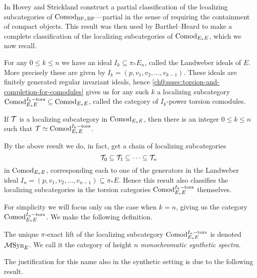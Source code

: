 In \cite{hovey-strickland_2005a} Hovey and Strickland construct a partial classification of the lcoalizing subcategories of $\mathrm{Comod}_{\mathrm{BP}_*\mathrm{BP}}$---partial in the sense of requiring the containment of compact objects. This result was then used by Barthel--Heard to make a complete classification of the localizing subcategories of $\mathrm{Comod}_{E_*E}$, which we now recall. 

For any $0\leq k\leq n$ we have an ideal $I_k \subseteq \pi_* E_n$, called the Landweber ideals of $E$. More precisely these are given by $I_k = (p, v_1, v_2, \ldots, v_{k-1})$. These ideals are finitely generated regular invariant ideals, hence \cref{ch0:sssec:torsion-and-completion-for-comodules} gives us for any such $k$ a localizing subcategory $\mathrm{Comod}_{E_*E}^{I_k-\mathrm{tors}}\subseteq \mathrm{Comod}_{E_*E}$, called the category of $I_k$-power torsion comodules. 

\begin{theorem}
    \label{ch3:add:thm:classification-of-abelian-localizing}
    If $\mathcal{T}$ is a localizing subcategory in $\mathrm{Comod}_{E_*E}$, then there is an integer $0\leq k\leq n$ such that $\mathcal{T} \simeq \mathrm{Comod}_{E_*E}^{I_k-\mathrm{tors}}$. 
\end{theorem}

\begin{remark}
    \label{ch3:add:rm:chain-of-localizing-subcategories}
    By the above result we do, in fact, get a chain of localizing subcategories
    \[\mathcal{T}_0 \subseteq \mathcal{T}_1\subseteq \cdots \subseteq \mathcal{T}_n \]
    in $\mathrm{Comod}_{E_*E}$, corresponding each to one of the generators in the Landweber ideal $I_n=(p, v_1, v_2, \ldots, v_{n-1})\subseteq \pi_* E$. Hence this result also classifies the localizing subcategories in the torsion categories $\mathrm{Comod}_{E_*E}^{I_k-\mathrm{tors}}$ themselves.  
\end{remark}

For simplicity we will focus only on the case when $k=n$, giving us the category $\mathrm{Comod}_{E_*E}^{I_n-\mathrm{tors}}$. We make the following definition. 

\begin{definition}
    The unique $\pi$-exact lift of the localizing subcategory $\mathrm{Comod}_{E_*E}^{I_n-\mathrm{tors}}$ is denoted $\mathcal{M}\mathrm{Syn}_{E}$. We call it the category of height $n$ \emph{monochromatic synthetic spectra}. 
\end{definition}

The justification for this name also in the synthetic setting is due to the following result. 

